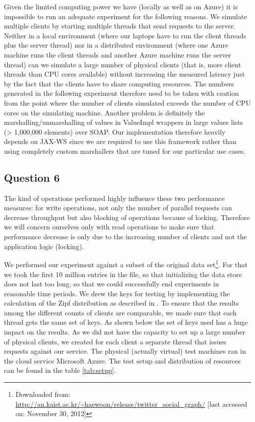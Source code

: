 \documentclass[12pt,a4paper]{article}
\begin{document}
  Given the limited computing power we have (locally as well as on Azure) it is impossible to run an adequate experiment for the following reasons. We simulate multiple clients by starting multiple threads that send requests to the server. Neither in a local environment (where our laptops have to run the client threads plus the server thread) nor in a distributed environment (where one Azure machine runs the client threads and another Azure machine runs the server thread) can we simulate a large number of physical clients (that is, more client threads than CPU cores available) without increasing the measured latency just by the fact that the clients have to share computing resources. The numbers generated in the following experiment therefore need to be taken with caution from the point where the number of clients simulated exceeds the number of CPU cores on the simulating machine. Another problem is definitely the marshalling/unmarshalling of values in ValueImpl wrappers in large values lists (> 1,000,000 elements) over SOAP. Our implementation therefore heavily depends on JAX-WS since we are required to use this framework rather than using completely custom marshallers that are tuned for our particular use cases.

\subsection*{Question 6}
\label{sec:pq6}
The kind of operations performed highly influence these two performance measures: for write operations, not only the number of parallel requests can decrease throughput but also blocking of operations because of locking. Therefore we will concern ourselves only with read operations to make sure that performance decrease is only due to the increasing number of clients and not the application logic (locking).

We performed our experiment against a subset of the original data set\footnote{Downloaded from: \url{http://an.kaist.ac.kr/~haewoon/release/twitter_social_graph/} [last accessed on: November 30, 2012]}. For that we took the first 10 million entries in the file, so that initializing the data store does not last too long, so that we could successfully end experiments in reasonable time periods.  We drew the keys for testing by implementing the calculation of the Zipf distribution as described in \cite{Gray1994}. To ensure that the results among the different counts of clients are comparable, we made sure that each thread gets the same set of keys. As shown below the set of keys used has a huge impact on the results. As we did not have the capacity to set up a large number of physical clients, we created for each client a separate thread that issues requests against our service. The physical (actually virtual) test machines ran in the cloud service Microsoft Azure. The test setup and distribution of resources can be found in the table \ref{tab:setup}.
\end{document}
